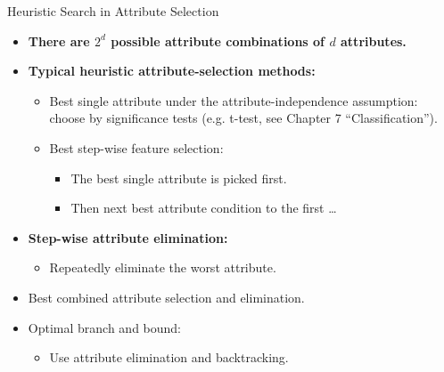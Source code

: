 \begin{frame}{Heuristic Search in Attribute Selection}
	\begin{itemize}
		\item \textbf{There are $2^d$ possible attribute combinations of $d$
			      attributes.}
		\item\textbf{\color{airforceblue}Typical heuristic attribute-selection
			      methods:}
		      \begin{itemize}
			      \item Best single attribute under the attribute-independence
			            assumption: \\ choose by significance tests (e.g. t-test, see
			            Chapter 7 ``Classification'').
			      \item Best step-wise feature selection:
			            \begin{itemize}
				            \item The best single attribute is picked first.
				            \item Then next best attribute condition to the first \ldots
			            \end{itemize}
		      \end{itemize}
		\item \textbf{\color{airforceblue}Step-wise attribute elimination:}
		      \begin{itemize}
			      \item Repeatedly eliminate the worst attribute.
		      \end{itemize}
		\item Best combined attribute selection and elimination.
		\item Optimal branch and bound:
		      \begin{itemize}
			      \item Use attribute elimination and backtracking.
		      \end{itemize}
	\end{itemize}
\end{frame}


